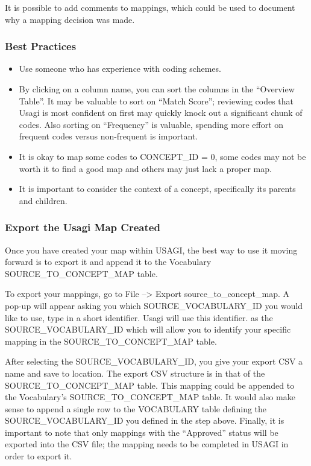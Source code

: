 \documentclass[11pt]{book}
\providecommand{\tightlist}{%
  \setlength{\itemsep}{0pt}\setlength{\parskip}{0pt}}
\theoremstyle{definition}
\theoremstyle{definition}
\theoremstyle{definition}
\theoremstyle{remark}
\begin{document}
It is possible to add comments to mappings, which could be used to
document why a mapping decision was made.

\subsubsection*{Best Practices}\label{best-practices}

\begin{itemize}
\tightlist
\item
  Use someone who has experience with coding schemes.
\item
  By clicking on a column name, you can sort the columns in the
  ``Overview Table''. It may be valuable to sort on ``Match Score'';
  reviewing codes that Usagi is most confident on first may quickly
  knock out a significant chunk of codes. Also sorting on ``Frequency''
  is valuable, spending more effort on frequent codes versus
  non-frequent is important.
\item
  It is okay to map some codes to CONCEPT\_ID = 0, some codes may not be
  worth it to find a good map and others may just lack a proper map.
\item
  It is important to consider the context of a concept, specifically its
  parents and children.
\end{itemize}

\subsubsection*{Export the Usagi Map
Created}\label{export-the-usagi-map-created}

Once you have created your map within USAGI, the best way to use it
moving forward is to export it and append it to the Vocabulary
SOURCE\_TO\_CONCEPT\_MAP table.

To export your mappings, go to File --\textgreater{} Export
source\_to\_concept\_map. A pop-up will appear asking you which
SOURCE\_VOCABULARY\_ID you would like to use, type in a short
identifier. Usagi will use this identifier. as the
SOURCE\_VOCABULARY\_ID which will allow you to identify your specific
mapping in the SOURCE\_TO\_CONCEPT\_MAP table.

After selecting the SOURCE\_VOCABULARY\_ID, you give your export CSV a
name and save to location. The export CSV structure is in that of the
SOURCE\_TO\_CONCEPT\_MAP table. This mapping could be appended to the
Vocabulary's SOURCE\_TO\_CONCEPT\_MAP table. It would also make sense to
append a single row to the VOCABULARY table defining the
SOURCE\_VOCABULARY\_ID you defined in the step above. Finally, it is
important to note that only mappings with the ``Approved'' status will
be exported into the CSV file; the mapping needs to be completed in
USAGI in order to export it.
\end{document}
